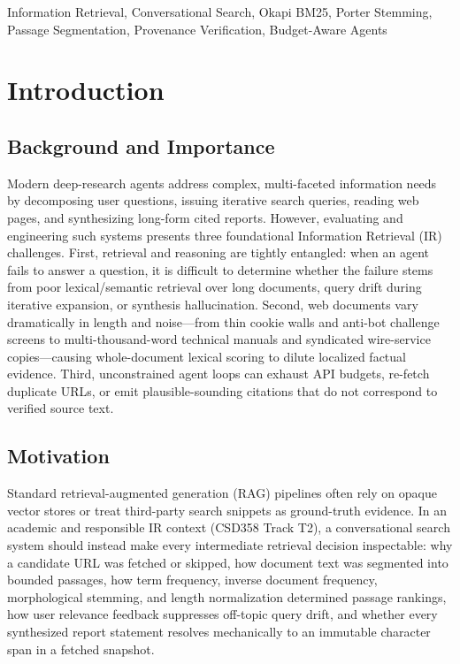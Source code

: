 \documentclass[conference]{IEEEtran}
\begin{document}
\begin{IEEEkeywords}
Information Retrieval, Conversational Search, Okapi BM25, Porter Stemming, Passage Segmentation, Provenance Verification, Budget-Aware Agents
\end{IEEEkeywords}

\section{Introduction}

\subsection{Background and Importance}
Modern deep-research agents address complex, multi-faceted information needs by decomposing user questions, issuing iterative search queries, reading web pages, and synthesizing long-form cited reports. However, evaluating and engineering such systems presents three foundational Information Retrieval (IR) challenges. First, retrieval and reasoning are tightly entangled: when an agent fails to answer a question, it is difficult to determine whether the failure stems from poor lexical/semantic retrieval over long documents, query drift during iterative expansion, or synthesis hallucination. Second, web documents vary dramatically in length and noise---from thin cookie walls and anti-bot challenge screens to multi-thousand-word technical manuals and syndicated wire-service copies---causing whole-document lexical scoring to dilute localized factual evidence. Third, unconstrained agent loops can exhaust API budgets, re-fetch duplicate URLs, or emit plausible-sounding citations that do not correspond to verified source text.

\subsection{Motivation}
Standard retrieval-augmented generation (RAG) pipelines often rely on opaque vector stores or treat third-party search snippets as ground-truth evidence. In an academic and responsible IR context (CSD358 Track T2), a conversational search system should instead make every intermediate retrieval decision inspectable: why a candidate URL was fetched or skipped, how document text was segmented into bounded passages, how term frequency, inverse document frequency, morphological stemming, and length normalization determined passage rankings, how user relevance feedback suppresses off-topic query drift, and whether every synthesized report statement resolves mechanically to an immutable character span in a fetched snapshot.
\end{document}

